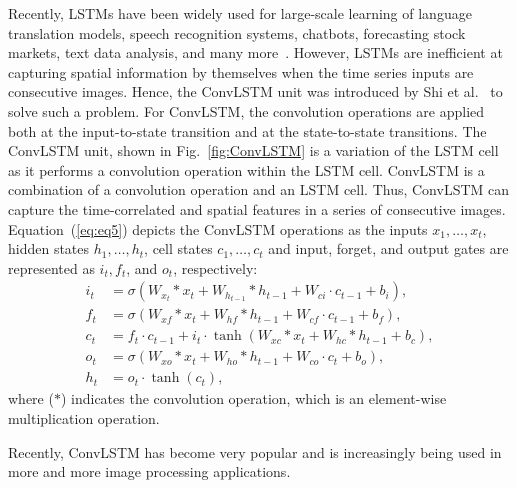Recently, LSTMs have been widely used for large-scale learning of language translation models, speech recognition systems, chatbots, forecasting stock markets, text data analysis, and many more~\cite{graves2014towards, cho2014properties}. 
However, LSTMs are inefficient at capturing spatial information by themselves when the time series inputs are consecutive images.
Hence, the ConvLSTM unit was introduced by Shi et al.~\cite{xingjian2015convolutional} to solve such a problem.
For ConvLSTM, the convolution operations are applied both at the input-to-state transition and at the state-to-state transitions.  
The ConvLSTM unit, shown in Fig.~\ref{fig:ConvLSTM} is a variation of the LSTM cell as it performs a convolution operation within the LSTM cell.
ConvLSTM is a combination of a convolution operation and an LSTM cell.
Thus, ConvLSTM can capture the time-correlated and spatial features in a series of consecutive images.
Equation~(\ref{eq:eq5}) depicts the ConvLSTM operations as the inputs \(x_1, \dots, x_t\), hidden states \(h_1, \dots, h_t\), cell states \(c_1, \dots, c_t\) and input, forget, and output gates are represented as \(i_t, f_t\), and \(o_t\), respectively:
\begin{equation}
	\begin{aligned}
		i_{t} &=\sigma\left(W_{x_t} * x_{t}+W_{h_{t-1}} * h_{t-1}+W_{c i} \cdot c_{t-1}+b_{i}\right),
		\\
		f_{t} &=\sigma\left(W_{x f} * x_{t}+W_{h f} * h_{t-1}+W_{c f} \cdot c_{t-1}+b_{f}\right), \\
		c_{t} &=f_{t} \cdot c_{t-1}+i_{t} \cdot \tanh \left(W_{x c} * x_{t}+W_{h c} * h_{t-1}+b_{c}\right), 
		\\
		o_{t} &=\sigma\left(W_{x o} * x_{t}+W_{h o} * h_{t-1}+W_{c o} \cdot c_{t}+b_{o}\right), \\
		h_{t} &=o_{t} \cdot \tanh \left(c_{t}\right),
	\end{aligned}
	\label{eq:eq5}
\end{equation}
where (\(*\)) indicates the convolution operation, which is an element-wise multiplication operation.

Recently, ConvLSTM has become very popular and is increasingly being used in 
more and more image processing applications.